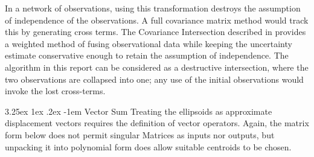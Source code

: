 \documentclass{article}
\makeatletter
\newcounter{subsubsubsection}[subsubsection]
\renewcommand\paragraph{\@startsection{paragraph}{5}{\z@}%
  {3.25ex \@plus1ex \@minus.2ex}%
  {-1em}%
  {\normalfont\normalsize\bfseries}}
\makeatother
\begin{document}
        In a network of observations, using this transformation destroys the assumption of independence of the observations.  A full covariance matrix method would track this by generating cross terms.  The Covariance Intersection described in \cite{CovarNoCorrel} provides a weighted method of fusing observational data while keeping the uncertainty estimate conservative enough to retain the assumption of independence.
        The algorithm in this report can be considered as a destructive intersection, where the two observations are collapsed into one; any use of the initial observations would invoke the lost cross-terms.

      
        \paragraph{Vector Sum}
          Treating the ellipsoids as approximate displacement vectors requires the definition of vector operators.
          Again, the matrix form below does not permit singular Matrices as inputs nor outputs, but unpacking it into polynomial form does allow suitable centroids to be chosen.
\end{document}
